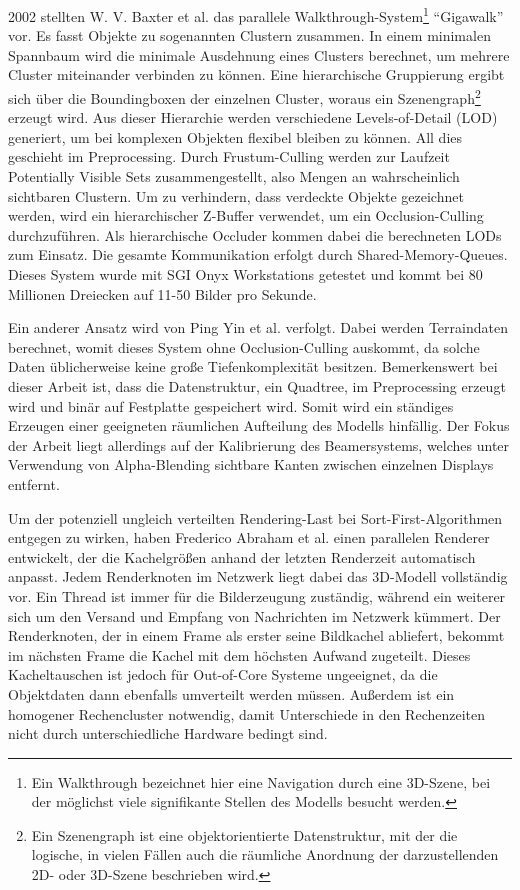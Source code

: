2002 stellten W. V. Baxter et al. das parallele Walkthrough-System\footnote{Ein Walkthrough bezeichnet hier eine Navigation durch eine 3D-Szene, bei der möglichst viele signifikante Stellen des Modells besucht werden.} "`Gigawalk"' vor. Es fasst Objekte zu sogenannten Clustern zusammen. In einem minimalen Spannbaum wird die minimale Ausdehnung eines Clusters berechnet, um mehrere Cluster miteinander verbinden zu können. Eine hierarchische Gruppierung ergibt sich über die Boundingboxen der einzelnen Cluster, woraus ein Szenengraph\footnote{Ein Szenengraph ist eine objektorientierte Datenstruktur, mit der die logische, in vielen Fällen auch die räumliche Anordnung der darzustellenden 2D- oder 3D-Szene beschrieben wird.} erzeugt wird. Aus dieser Hierarchie werden verschiedene Levels-of-Detail (LOD) generiert, um bei komplexen Objekten flexibel bleiben zu können. All dies geschieht im Preprocessing. Durch Frustum-Culling werden zur Laufzeit Potentially Visible Sets zusammengestellt, also Mengen an wahrscheinlich sichtbaren Clustern. Um zu verhindern, dass verdeckte Objekte gezeichnet werden, wird ein hierarchischer Z-Buffer verwendet, um ein Occlusion-Culling durchzuführen. Als hierarchische Occluder kommen dabei die berechneten LODs zum Einsatz. Die gesamte Kommunikation erfolgt durch Shared-Memory-Queues. Dieses System wurde mit SGI Onyx Workstations getestet und kommt bei 80 Millionen Dreiecken auf 11-50 Bilder pro Sekunde.


Ein anderer Ansatz wird von Ping Yin et al. verfolgt. Dabei werden Terraindaten berechnet, womit dieses System ohne Occlusion-Culling auskommt, da solche Daten üblicherweise keine große Tiefenkomplexität besitzen. Bemerkenswert bei dieser Arbeit ist, dass die Datenstruktur, ein Quadtree, im Preprocessing erzeugt wird und binär auf Festplatte gespeichert wird. Somit wird ein ständiges Erzeugen einer geeigneten räumlichen Aufteilung des Modells hinfällig. Der Fokus der Arbeit liegt allerdings auf der Kalibrierung des Beamersystems, welches unter Verwendung von Alpha-Blending sichtbare Kanten zwischen einzelnen Displays entfernt.


Um der potenziell ungleich verteilten Rendering-Last bei Sort-First-Algorithmen entgegen zu wirken, haben Frederico Abraham et al. einen parallelen Renderer entwickelt, der die Kachelgrößen anhand der letzten Renderzeit automatisch anpasst. Jedem Renderknoten im Netzwerk liegt dabei das 3D-Modell vollständig vor. Ein Thread ist immer für die Bilderzeugung zuständig, während ein weiterer sich um den Versand und Empfang von Nachrichten im Netzwerk kümmert. Der Renderknoten, der in einem Frame als erster seine Bildkachel abliefert, bekommt im nächsten Frame die Kachel mit dem höchsten Aufwand zugeteilt. Dieses Kacheltauschen ist jedoch für Out-of-Core Systeme ungeeignet, da die Objektdaten dann ebenfalls umverteilt werden müssen. Außerdem ist ein homogener Rechencluster notwendig, damit Unterschiede in den Rechenzeiten nicht durch unterschiedliche Hardware bedingt sind.

